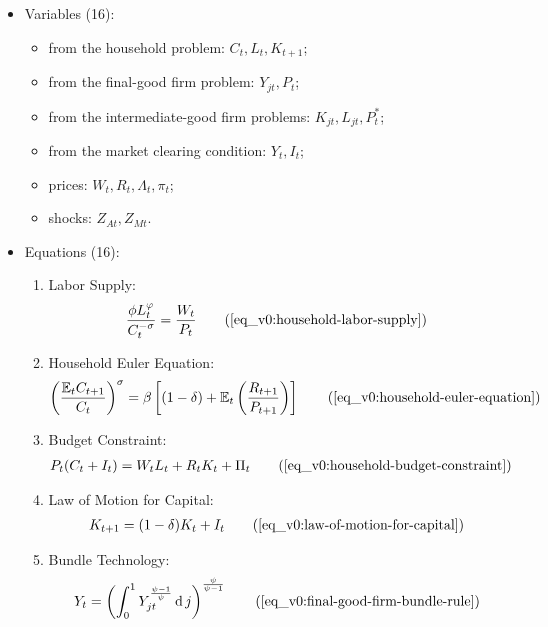 \documentclass[
thesis.tex
]{subfiles}
\begin{document}
	{\singlespacing
		
		\begin{itemize}
			\item Variables (16):
			
			\begin{itemize}
				\item from the household problem: $C_t, L_t, K_{t+1}$;
				\item from the final-good firm problem: $Y_{jt}, P_t$;
				\item from the intermediate-good firm problems: $K_{jt}, L_{jt}, P_t^\ast$;
				\item from the market clearing condition: $Y_t, I_t$;
				\item prices: $W_t, R_t, \Lambda_t, \pi_t$;
				\item shocks: $Z_{At}, Z_{Mt}$.
			\end{itemize}
			\item Equations (16):
			
			\begin{enumerate}
				\item Labor Supply:
				\begin{align}
					\frac{\phi L_t^{\varphi}}{C_t^{-\sigma}} = \frac{W_t}{P_t}
					\tag{\ref{eq_v0:household-labor-supply}}
				\end{align}
				
				\item Household Euler Equation:
				\begin{align}
					\left( \frac{\mathbb{E}_t C_{t+1}}{C_t} \right)^\sigma = \beta \left[ (1-\delta) + \mathbb{E}_t \left(\frac{R_{t+1}}{P_{t+1}}\right) \right]
					\tag{\ref{eq_v0:household-euler-equation}}
				\end{align}
				
				\item Budget Constraint: 
				\begin{align}
					P_t (C_t + I_t) = W_t L_t + R_t K_t + \Pi_t
					\tag{\ref{eq_v0:household-budget-constraint}}
				\end{align}
				
				\item Law of Motion for Capital:
				\begin{align}
					K_{t+1} = (1-\delta)K_t + I_t
					\tag{\ref{eq_v0:law-of-motion-for-capital}}
				\end{align}
				
				\item Bundle Technology:
				\begin{align}
					Y_t = \left( \int_{0}^{1} Y_{jt}^{\frac{\psi-1}{\psi}} \dif j \right)^{\frac{\psi}{\psi-1}}
					\tag{\ref{eq_v0:final-good-firm-bundle-rule}}
				\end{align}
				

\end{enumerate}
\end{itemize}}
\end{document}
